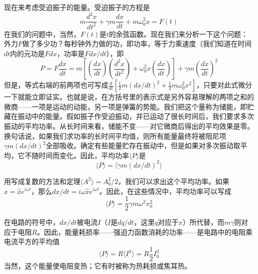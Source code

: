现在来考虑受迫振子的能量。受迫振子的方程是
\begin{equation}
    \label{Eq:I:24:1}
    m\frac{d^2x}{dt^2} + \gamma m\frac{dx}{dt} + m\omega_0^2x = F(t)
\end{equation}
在我们的问题中，当然，$F(t)$是$t$的余弦函数。现在我们来分析一下这个问题：外力$F$做了多少功？每秒钟外力做的功，即功率，等于力乘速度（我们知道在时间$dt$内的元功是$Fdx$，功率是$Fdx/dt$），即
\begin{equation}
    \label{Eq:I:24:2}
    P=F\frac{dx}{dt} = m \left [ \left (\frac{dx}{dt} \right ) \left ( \frac{d^2x}{dt^2} \right ) + \omega_0^2x\left ( \frac{dx}{dt} \right ) \right ] + \gamma m \left ( \frac{dx}{dt} \right )^2
\end{equation}
但是，等式右端的前两项也可写成$\frac{d}{dt} \left [\frac{1}{2}m(dx/dt)^2 + \frac{1}{2}m\omega_0^2x^2 \right ]$，只要对此式微分一下就能立即证实。也就是说，在方括号里的表示式是另外容易理解的两项之和的微商——一项是运动的动能，另一项是弹簧的势能。我们把这个量称为储能，即贮藏在振动中的能量。假如振子作受迫振动，并已运动了很长时间后，我们要求多次振动的平均功率。从长时间来看，储能不变——对它微商后得出的平均效果是零。换句话说，如果我们求功率的长时间平均值，则所有能量最终将被阻尼项$\gamma m(dx/dt)^2$全部吸收。确定有些能量贮存在振动中，但是如果对多次振动取平均，它不随时间而变化。因此，平均功率$\langle P \rangle $是
\begin{equation}
    \label{Eq:I:24:3}
    \langle P \rangle = \langle \gamma m(dx/dt)^2 \rangle
\end{equation}

用写成复数的方法和定理$\langle A^2 \rangle = A_0^2/2$，我们可以求出这个平均功率。如果$x=\hat{x}e^{i\omega t}$，那么$dx/dt=i\omega\hat{x}e^{i\omega t}$。因此，在这些情况中，平均功率可以写成
\begin{equation}
    \label{Eq:I:24:4}
    \langle P \rangle = \frac{1}{2}\gamma m \omega^2x_0^2
\end{equation}

在电路的符号中，$dx/dt$被电流$I$（$I$是$dq/dt$，这里$q$对应于$x$）所代替，而$m\gamma$则对应于电阻$R$。因此，能量耗损率——强迫力函数消耗的功率——是电路中的电阻乘电流平方的平均值
\begin{equation}
    \label{Eq:I:24:5}
    \langle P \rangle = R \langle I^2 \rangle = R\frac{1}{2}I_0^2
\end{equation}
当然，这个能量使电阻变热；它有时被称为热耗损或焦耳热。

